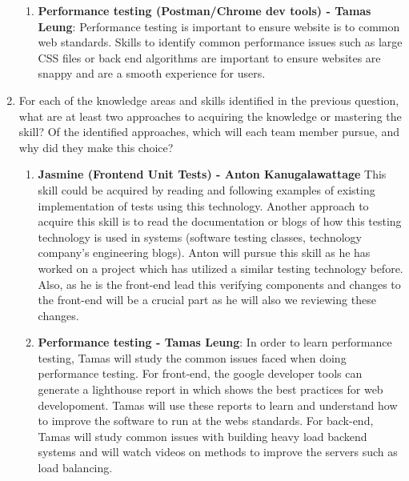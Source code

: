 \documentclass[12pt, titlepage]{article}
\begin{document}
\begin{enumerate}
\begin{enumerate}
    \item \textbf{Performance testing (Postman/Chrome dev tools) - Tamas Leung}: Performance testing is important to ensure website is to common web standards. Skills to identify common performance issues such as large CSS files or back end algorithms are important to ensure websites are snappy and are a smooth experience for users.
    
\end{enumerate}

  \item For each of the knowledge areas and skills identified in the previous
  question, what are at least two approaches to acquiring the knowledge or
  mastering the skill?  Of the identified approaches, which will each team
  member pursue, and why did they make this choice?
  
  \begin{enumerate}
\item \textbf{Jasmine (Frontend Unit Tests) - Anton Kanugalawattage} This skill could be acquired by reading and following examples of existing implementation of tests using this technology. Another approach to acquire this skill is to read the documentation or blogs of how this testing technology is used in systems (software testing classes, technology company's engineering blogs). Anton will pursue this skill as he has worked on a project which has utilized a similar testing technology before. Also, as he is the front-end lead this verifying components and changes to the front-end will be a crucial part as he will also we reviewing these changes.

\item  \textbf{Performance testing - Tamas Leung}: In order to learn performance testing, Tamas will study the common issues faced when doing performance testing. For front-end, the google developer tools can generate a lighthouse report in which shows the best practices for web developoment. Tamas will use these reports to learn and understand how to improve the software to run at the webs standards. For back-end, Tamas will study common issues with building heavy load backend systems and will watch videos on methods to improve the servers such as load balancing.


\end{enumerate}
\end{enumerate}
\end{document}
